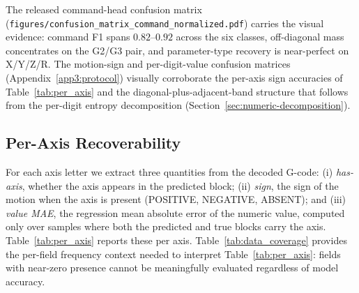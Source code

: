 \documentclass[sensors,article,submit,moreauthors,pdftex]{Definitions/mdpi}
\begin{document}
The released command-head confusion matrix (\texttt{figures/confusion\_matrix\_command\_normalized.pdf}) carries the visual evidence: command F1 spans $0.82$--$0.92$ across the six classes, off-diagonal mass concentrates on the G2/G3 pair, and parameter-type recovery is near-perfect on X/Y/Z/R. The motion-sign and per-digit-value confusion matrices (Appendix~\ref{app3:protocol}) visually corroborate the per-axis sign accuracies of Table~\ref{tab:per_axis} and the diagonal-plus-adjacent-band structure that follows from the per-digit entropy decomposition (Section~\ref{sec:numeric-decomposition}).

\subsection{Per-Axis Recoverability}
\label{sec:per-axis}

For each axis letter we extract three quantities from the decoded G-code: (i) \emph{has-axis}, whether the axis appears in the predicted block; (ii) \emph{sign}, the sign of the motion when the axis is present (POSITIVE, NEGATIVE, ABSENT); and (iii) \emph{value MAE}, the regression mean absolute error of the numeric value, computed only over samples where both the predicted and true blocks carry the axis. Table~\ref{tab:per_axis} reports these per axis. Table~\ref{tab:data_coverage} provides the per-field frequency context needed to interpret Table~\ref{tab:per_axis}: fields with near-zero presence cannot be meaningfully evaluated regardless of model accuracy.




\end{document}
